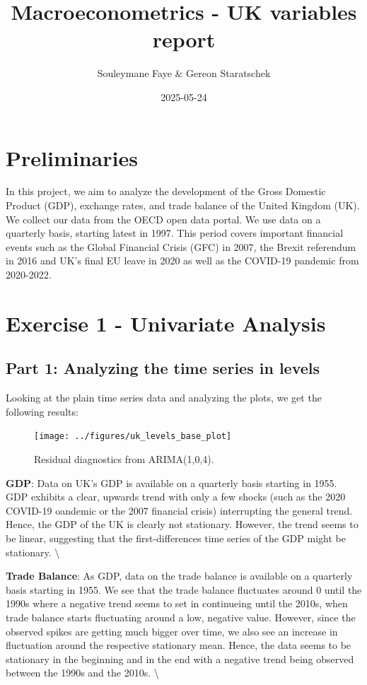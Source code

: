 \documentclass[
]{article}
\title{Macroeconometrics - UK variables report}
\author{Souleymane Faye \& Gereon Staratschek}
\date{2025-05-24}
\begin{document}
\maketitle

\section*{Preliminaries}

In this project, we aim to analyze the development of the Gross Domestic
Product (GDP), exchange rates, and trade balance of the United Kingdom
(UK). We collect our data from the OECD open data portal. We use data on
a quarterly basis, starting latest in 1997. This period covers important
financial events such as the Global Financial Crisis (GFC) in 2007, the
Brexit referendum in 2016 and UK's final EU leave in 2020 as well as the
COVID-19 pandemic from 2020-2022.

\section*{Exercise 1 -  Univariate Analysis}

\subsection*{Part 1: Analyzing the time series in levels}

Looking at the plain time series data and analyzing the plots, we get
the following results:

\begin{figure}

{\centering \texttt{[image: ../figures/uk\_levels\_base\_plot]} 

}

\caption{Residual diagnostics from ARIMA(1,0,4).}\label{fig:resid-plot}
\end{figure}

\textbf{GDP}: Data on UK's GDP is available on a quarterly basis
starting in 1955. GDP exhibits a clear, upwards trend with only a few
shocks (such as the 2020 COVID-19 oandemic or the 2007 financial crisis)
interrupting the general trend. Hence, the GDP of the UK is clearly not
stationary. However, the trend seems to be linear, suggesting that the
first-differences time series of the GDP might be stationary.
\textbackslash{}

\textbf{Trade Balance}: As GDP, data on the trade balance is available
on a quarterly basis starting in 1955. We see that the trade balance
fluctuates around 0 until the 1990s where a negative trend seems to set
in continueing until the 2010s, when trade balance starts fluctuating
around a low, negative value. However, since the observed spikes are
getting much bigger over time, we also see an increase in fluctuation
around the respective stationary mean. Hence, the data seems to be
stationary in the beginning and in the end with a negative trend being
observed between the 1990s and the 2010s. \textbackslash{}
\end{document}
